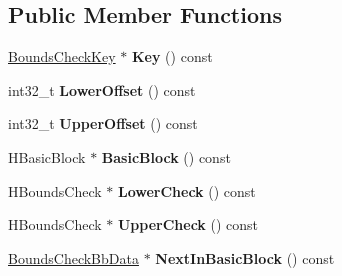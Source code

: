 \subsection*{Public Member Functions}
\begin{DoxyCompactItemize}
\item 
\hypertarget{classv8_1_1internal_1_1_bounds_check_bb_data_a7b3d5d8de22ca1b4841933f419a23f1d}{}\hyperlink{classv8_1_1internal_1_1_bounds_check_key}{Bounds\+Check\+Key} $\ast$ {\bfseries Key} () const \label{classv8_1_1internal_1_1_bounds_check_bb_data_a7b3d5d8de22ca1b4841933f419a23f1d}

\item 
\hypertarget{classv8_1_1internal_1_1_bounds_check_bb_data_a00a7a117fd9fadfad54adb61d34e2c4d}{}int32\+\_\+t {\bfseries Lower\+Offset} () const \label{classv8_1_1internal_1_1_bounds_check_bb_data_a00a7a117fd9fadfad54adb61d34e2c4d}

\item 
\hypertarget{classv8_1_1internal_1_1_bounds_check_bb_data_abc2cb4b4eaa91817cd3931f8fdbc4108}{}int32\+\_\+t {\bfseries Upper\+Offset} () const \label{classv8_1_1internal_1_1_bounds_check_bb_data_abc2cb4b4eaa91817cd3931f8fdbc4108}

\item 
\hypertarget{classv8_1_1internal_1_1_bounds_check_bb_data_aa926c9b8b56376984c043887752edc6b}{}H\+Basic\+Block $\ast$ {\bfseries Basic\+Block} () const \label{classv8_1_1internal_1_1_bounds_check_bb_data_aa926c9b8b56376984c043887752edc6b}

\item 
\hypertarget{classv8_1_1internal_1_1_bounds_check_bb_data_a06575926542e1ce8fddbafb986c27537}{}H\+Bounds\+Check $\ast$ {\bfseries Lower\+Check} () const \label{classv8_1_1internal_1_1_bounds_check_bb_data_a06575926542e1ce8fddbafb986c27537}

\item 
\hypertarget{classv8_1_1internal_1_1_bounds_check_bb_data_a54187bc9859ecde619cfd4f437bb92d2}{}H\+Bounds\+Check $\ast$ {\bfseries Upper\+Check} () const \label{classv8_1_1internal_1_1_bounds_check_bb_data_a54187bc9859ecde619cfd4f437bb92d2}

\item 
\hypertarget{classv8_1_1internal_1_1_bounds_check_bb_data_abddbde7da0ab8852c2a511c890fe9c0d}{}\hyperlink{classv8_1_1internal_1_1_bounds_check_bb_data}{Bounds\+Check\+Bb\+Data} $\ast$ {\bfseries Next\+In\+Basic\+Block} () const \label{classv8_1_1internal_1_1_bounds_check_bb_data_abddbde7da0ab8852c2a511c890fe9c0d}


\end{DoxyCompactItemize}
